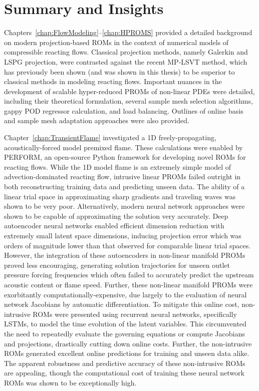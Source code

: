 \section{Summary and Insights}

Chapters~\ref{chap:FlowModeling}--\ref{chap:HPROMS} provided a detailed background on modern projection-based ROMs in the context of numerical models of compressible reacting flows. Classical projection methods, namely Galerkin and LSPG projection, were contrasted against the recent MP-LSVT method, which has previously been shown (and was shown in this thesis) to be superior to classical methods in modeling reacting flows. Important nuances in the development of scalable hyper-reduced PROMs of non-linear PDEs were detailed, including their theoretical formulation, several sample mesh selection algorithms, gappy POD regressor calculation, and load balancing. Outlines of online basis and sample mesh adaptation approaches were also provided. 

Chapter~\ref{chap:TransientFlame} investigated a 1D freely-propagating, acoustically-forced model premixed flame. These calculations were enabled by PERFORM, an open-source Python framework for developing novel ROMs for reacting flows. While the 1D model flame is an extremely simple model of advection-dominated reacting flow, intrusive linear PROMs failed outright in both reconstructing training data and predicting unseen data. The ability of a linear trial space in approximating sharp gradients and traveling waves was shown to be very poor. Alternatively, modern neural network approaches were shown to be capable of approximating the solution very accurately. Deep autoencoder neural networks enabled efficient dimension reduction with extremely small latent space dimensions, inducing projection error which was orders of magnitude lower than that observed for comparable linear trial spaces. However, the integration of these autoencoders in non-linear manifold PROMs proved less encouraging, generating solution trajectories for unseen outlet pressure forcing frequencies which often failed to accurately predict the upstream acoustic content or flame speed. Further, these non-linear manifold PROMs were exorbitantly computationally-expensive, due largely to the evaluation of neural network Jacobians by automatic differentiation. To mitigate this online cost, non-intrusive ROMs were presented using recurrent neural networks, specifically LSTMs, to model the time evolution of the latent variables. This circumvented the need to repeatedly evaluate the governing equations or compute Jacobians and projections, drastically cutting down online costs. Further, the non-intrusive ROMs generated excellent online predictions for training and unseen data alike. The apparent robustness and predictive accuracy of these non-intrusive ROMs are appealing, though the computational cost of training these neural network ROMs was shown to be exceptionally high.

